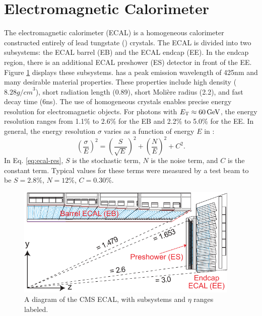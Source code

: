 \section{Electromagnetic Calorimeter}

The electromagnetic calorimeter (ECAL) is a homogeneous calorimeter constructed entirely of lead tungstate (\pbwo) crystals. The ECAL is divided into two subsystems: the ECAL barrel (EB) and the ECAL endcap (EE). In the endcap region, there is an additional ECAL preshower (ES) detector in front of the EE. Figure \ref{fig:ecal-layout} displays these subsystems. \pbwo has a peak emission wavelength of 425\unit{nm} and many desirable material properties. These properties include high density ($8.28\unit{g/cm}^3$), short radiation length (0.89\cm), short Moli\`{e}re radius (2.2\cm), and fast decay time (6\unit{ns}). The use of homogeneous \pbwo crystals enables precise energy resolution for electromagnetic objects. For photons with ${E}_{\mathrm{T}} \approx 60\,\text{Ge\hspace{-.08em}V}$, the energy resolution ranges from 1.1\% to 2.6\% for the EB and 2.2\% to 5.0\% for the EE. In general, the energy resolution $\sigma$ varies as a function of energy $E$ in \GeVns:
\begin{equation}
\label{eq:ecal-res} \left(\frac{\sigma}{E}\right)^{2} = \left(\frac{S}{\sqrt{E}}\right)^{2} + \left(\frac{N}{E}\right)^{2} + C^{2}.
\end{equation}
In Eq. \eqref{eq:ecal-res}, $S$ is the stochastic term, $N$ is the noise term, and $C$ is the constant term. Typical values for these terms were measured by a test beam to be $S=2.8\%$, $N=12\%$, $C=0.30\%$.

\begin{figure}[hbt]
\begin{center}
\includegraphics[width=0.95\textwidth]{figures/ECAL_transverse_section.pdf}
\caption{A diagram of the CMS ECAL, with subsystems and $\eta$ ranges labeled.}
\label{fig:ecal-layout}
\end{center}
\end{figure}

